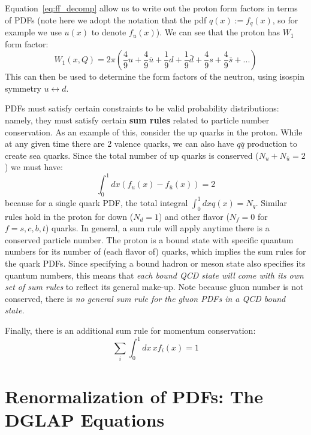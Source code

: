 \documentclass[11pt, oneside]{article}   	%
\theoremstyle{definition}
\begin{document}
Equation~\ref{eq:ff_decomp} allow us to write out the proton form factors in terms of PDFs (note here we adopt the notation that the pdf $q(x) := 
f_q(x)$, so for example we use $u(x)$ to denote $f_u(x)$). We can see that the proton has $W_1$ form factor:
\begin{equation}
	W_1(x, Q) = 2\pi\left(\frac{4}{9} u + \frac{4}{9}\bar u + \frac{1}{9} d + \frac{1}{9}\bar d+ \frac{4}{9} s + \frac{4}{9}\bar s + ...\right)
\end{equation}
This can then be used to determine the form factors of the neutron, using isospin symmetry $u\leftrightarrow d$. 

PDFs must satisfy certain constraints to be valid probability distributions: namely, they must satisfy certain \textbf{sum rules} related to 
particle number conservation. As an example of this, consider the up quarks in the proton. While at any given time there are 2 valence quarks, 
we can also have $q\overline q$ production to create sea quarks. Since the total number of up quarks is conserved ($N_u + N_{\bar u} = 2$) 
we must have:
\begin{equation}
	\int_0^1dx \left(f_{u}(x) - f_{\bar u}(x)\right) = 2
\end{equation}
because for a single quark PDF, the total integral $\int_0^1dx q(x) = N_q$. Similar rules hold in the proton for down ($N_d = 1$) and other 
flavor ($N_f = 0$ for $f = s, c, b, t$) quarks. In general, a sum rule will apply anytime there is a conserved particle number. The proton is a bound 
state with specific quantum numbers for its number of (each flavor of) quarks, which implies the sum rules for the quark PDFs. Since specifying a 
bound hadron or meson state also specifies its quantum numbers, this means that \textit{each bound QCD state will come with its own set of sum 
rules} to reflect its general make-up. Note because gluon number is not conserved, there is \textit{no general sum rule for the gluon PDFs in a QCD 
bound state}. 

Finally, there is an additional sum rule for momentum conservation:
\begin{equation}
	\sum_i \int_0^1 dx\, x f_i(x) = 1
\end{equation}

\newpage
\section{Renormalization of PDFs: The DGLAP Equations}
\end{document}
